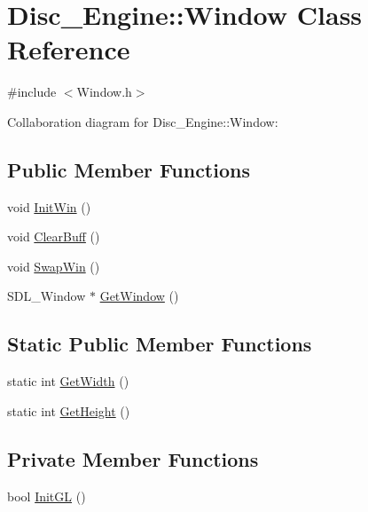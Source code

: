 \hypertarget{class_disc___engine_1_1_window}{}\section{Disc\+\_\+\+Engine\+:\+:Window Class Reference}
\label{class_disc___engine_1_1_window}


{\ttfamily \#include $<$Window.\+h$>$}



Collaboration diagram for Disc\+\_\+\+Engine\+:\+:Window\+:
\subsection*{Public Member Functions}
\begin{DoxyCompactItemize}
\item 
void \mbox{\hyperlink{class_disc___engine_1_1_window_a6f68d816b1c9cafd476f66c6d24a8f39}{Init\+Win}} ()
\item 
void \mbox{\hyperlink{class_disc___engine_1_1_window_adc6ab71d35084b660a8b63c4ae2fdbbe}{Clear\+Buff}} ()
\item 
void \mbox{\hyperlink{class_disc___engine_1_1_window_a8298d1d43ffeff1967178753e2570af4}{Swap\+Win}} ()
\item 
S\+D\+L\+\_\+\+Window $\ast$ \mbox{\hyperlink{class_disc___engine_1_1_window_a3a8c4a5407ae9784a89982a94d0f7c70}{Get\+Window}} ()
\end{DoxyCompactItemize}
\subsection*{Static Public Member Functions}
\begin{DoxyCompactItemize}
\item 
static int \mbox{\hyperlink{class_disc___engine_1_1_window_ac3ff975d1f881d7806656f01d1abad83}{Get\+Width}} ()
\item 
static int \mbox{\hyperlink{class_disc___engine_1_1_window_aa234876b2ba5d3538b717e66c5ccbc5c}{Get\+Height}} ()
\end{DoxyCompactItemize}
\subsection*{Private Member Functions}
\begin{DoxyCompactItemize}
\item 
bool \mbox{\hyperlink{class_disc___engine_1_1_window_a16395d0d51ede38f00de40024b0b5e06}{Init\+GL}} ()
\end{DoxyCompactItemize}
